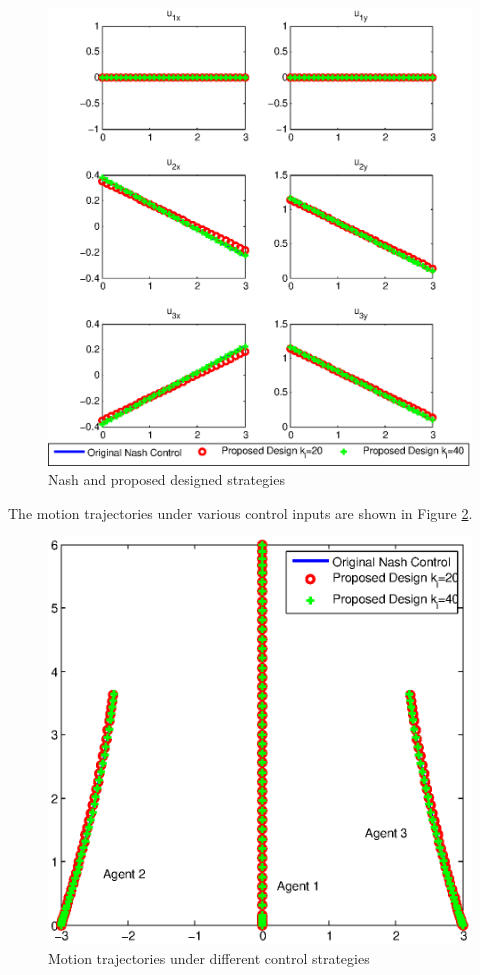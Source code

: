 \documentclass[letterpaper, 10 pt, conference,onecolumn]{ieeeconf}  %
\begin{document}
\begin{figure}[h]
      \centering
      \includegraphics[scale=0.58]{Original_Distributed_control.eps}
      \caption{Nash and proposed designed strategies}\label{Original_Distributed_control}
\end{figure}
The motion trajectories under various control inputs are shown in Figure \ref{TrajectoryUndirected}.
\begin{figure}[h]
      \centering
      \includegraphics[scale=0.5]{TrajectoryUndirected.eps}
      \caption{Motion trajectories under different control strategies}\label{TrajectoryUndirected}
\end{figure}
\end{document}
